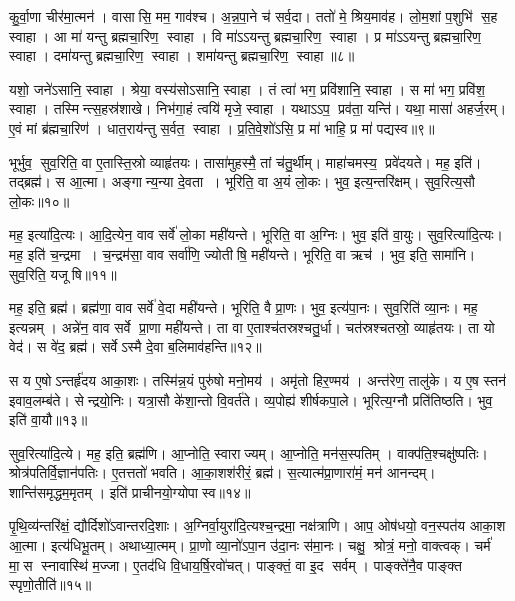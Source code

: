 कु॒र्वा॒णा चीर॑मा॒त्मन॑। वासासि॒ मम॒ गाव॑श्च। अ॒न्न॒पा॒ने च॑ सर्व॒दा। ततो॑ मे॒ श्रिय॒माव॑ह। लो॒म॒शां प॒शुभि॑ स॒ह स्वाहा। आ मा॑ यन्तु ब्रह्मचा॒रिण॒ स्वाहा। वि मा॑ऽऽयन्तु ब्रह्मचा॒रिण॒ स्वाहा। प्र मा॑ऽऽयन्तु ब्रह्मचा॒रिण॒ स्वाहा। दमा॑यन्तु ब्रह्मचा॒रिण॒ स्वाहा। शमा॑यन्तु ब्रह्मचा॒रिण॒ स्वाहा॥८॥

    यशो॒ जने॑ऽसानि॒ स्वाहा। श्रेया॒\an{} वस्य॑सोऽसानि॒ स्वाहा। तं त्वा॑ भग॒ प्रवि॑शानि॒ स्वाहा। स मा॑ भग॒ प्रवि॑श॒ स्वाहा। तस्मिन्त्स॒हस्र॑शाखे। निभ॑गा॒हं त्वयि॑ मृजे॒ स्वाहा। यथाऽऽप॒ प्रव॑ता॒ यन्ति॑। यथा॒ मासा॑ अहर्ज॒रम्। ए॒वं मां ब्र॑ह्मचा॒रिण॑। धात॒राय॑न्तु स॒र्वत॒ स्वाहा। प्र॒ति॒वे॒शो॑ऽसि॒ प्र मा॑ भाहि॒ प्र मा॑ पद्यस्व॥९॥
\anuvakamend%

भूर्भुव॒ सुव॒रिति॒ वा ए॒तास्ति॒स्रो व्याहृ॑तयः। तासा॑मुहस्मै॒ तां च॑तु॒र्थीम्। माहा॑चमस्य॒ प्रवे॑दयते। मह॒ इति॑। तद्ब्रह्म॑। स आ॒त्मा। अङ्गान्य॒न्या दे॒वता। भूरिति॒ वा अ॒यं लो॒कः। भुव॒ इत्य॒न्तरि॑क्षम्। सुव॒रित्य॒सौ लो॒कः॥१०॥

मह॒ इत्या॑दि॒त्यः। आ॒दि॒त्येन॒ वाव सर्वे॑ लो॒का मही॑यन्ते। भूरिति॒ वा अ॒ग्निः। भुव॒ इति॑ वा॒युः। सुव॒रित्या॑दि॒त्यः। मह॒ इति॑ च॒न्द्रमा। च॒न्द्रम॑सा॒ वाव सर्वा॑णि॒ ज्योतीषि॒ मही॑यन्ते। भूरिति॒ वा ऋच॑। भुव॒ इति॒ सामा॑नि। सुव॒रिति॒ यजूषि॥११॥

मह॒ इति॒ ब्रह्म॑। ब्रह्म॑णा॒ वाव सर्वे॑ वे॒दा मही॑यन्ते। भूरिति॒ वै प्रा॒णः। भुव॒ इत्य॑पा॒नः। सुव॒रिति॑ व्या॒नः। मह॒ इत्यन्नम्। अन्ने॑न॒ वाव सर्वे प्रा॒णा मही॑यन्ते। ता वा ए॒ताश्च॑तस्रश्चतु॒र्धा। चत॑स्रश्चतस्रो॒ व्याहृ॑तयः। ता यो वेद॑। स वे॑द॒ ब्रह्म॑। सर्वेऽस्मै दे॒वा ब॒लिमाव॑हन्ति॥१२॥
\anuvakamend[अ॒सौ लो॒को यजूषि॒ वेद॒ द्वे च॑]

स य ए॒षोऽन्तर्\mbox{}हृ॑दय आका॒शः। तस्मि॑न्न॒यं पुरु॑षो मनो॒मय॑। अमृ॑तो हिर॒ण्मय॑। अन्त॑रेण॒ तालु॑के। य ए॒ष स्तन॑ इवाव॒\-लम्ब॑ते। सेन्द्रयो॒निः। यत्रा॒सौ के॑शा॒न्तो वि॒वर्त॑ते। व्य॒पोह्य॑ शीर्\mbox{}षकपा॒ले। भूरित्य॒ग्नौ प्रति॑तिष्ठति। भुव॒ इति॑ वा॒यौ॥१३॥

सुव॒रित्या॑दि॒त्ये। मह॒ इति॒ ब्रह्म॑णि। आ॒प्नोति॒ स्वाराज्यम्। आ॒प्नोति॒ मन॑स॒स्पतिम्। वाक्प॑ति॒श्चक्षु॑ष्पतिः। श्रोत्र॑पतिर्वि॒\-ज्ञान॑पतिः। ए॒तत्ततो॑ भवति। आ॒का॒शश॑रीरं॒ ब्रह्म॑। स॒त्यात्म॑प्रा॒णारा॑मं॒ मन॑ आनन्दम्। शान्ति॑समृद्धम॒मृतम्। इति॑ प्राचीनयो॒ग्योपास्व॥१४॥
\anuvakamend[वा॒याव॒मृत॒मेकं॑ च]

पृ॒थि॒व्य॑न्तरि॑क्षं॒ द्यौर्दिशो॑ऽवान्तरदि॒शाः। अ॒ग्निर्वा॒युरा॑दि॒त्य\-श्च॒न्द्रमा॒ नक्ष॑त्राणि। आप॒ ओष॑धयो॒ वन॒स्पत॑य आका॒श आ॒त्मा। इत्य॑धिभू॒तम्। अथाध्या॒त्मम्। प्रा॒णो व्या॒नो॑ऽपा॒न उ॑दा॒नः स॑मा॒नः। चक्षु॒ श्रोत्रं॒ मनो॒ वाक्त्वक्। चर्म॑ मा॒स स्नावास्थि॑ म॒ज्जा। ए॒तद॑धि वि॒धाय॒र्\mbox{}षि॒रवो॑चत्। पाङ्क्तं॒ वा इ॒द सर्वम्। पाङ्क्ते॑नै॒व पाङ्क्त स्पृणो॒तीति॑॥१५॥
\anuvakamend[सर्व॒मेकं॑ च]

